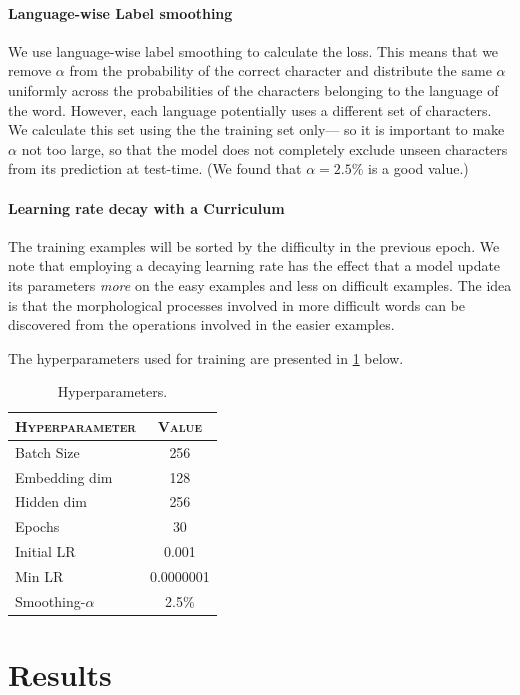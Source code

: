 \documentclass[11pt,a4paper]{article}
\begin{document}
\paragraph{Language-wise Label smoothing} We use language-wise label
smoothing to calculate the loss. This means that we remove $\alpha$
from the probability of the correct character and distribute the same
$\alpha$ uniformly across the probabilities of the characters
belonging to the language of the word. However, each language
potentially uses a different set of characters. We calculate this set
using the the training set only--- so it is important to make $\alpha$
not too large, so that the model does not completely exclude unseen
characters from its prediction at test-time. (We found that
\(\alpha=2.5\%\) is a good value.)

\paragraph{Learning rate decay with a Curriculum} The training
examples will be sorted by the difficulty in the previous epoch.  We
note that employing a decaying learning rate has the effect that a
model update its parameters \textit{more} on the easy examples and
less on difficult examples. The idea is that the morphological
processes involved in more difficult words can be discovered from the
operations involved in the easier examples.

The hyperparameters used for training are presented in \cref{tab:hp} below.
\begin{table}[h]	
\centering
\begin{tabular}{lc}
\textsc{Hyperparameter} & \textsc{Value} \\
  \hline
  Batch Size & 256 \\
  Embedding dim & 128 \\
  Hidden dim & 256 \\
  Epochs & 30 \\
  Initial LR & 0.001 \\
  Min LR & 0.0000001 \\
  Smoothing-$\alpha$ & 2.5\% \\
\end{tabular} 
\caption{Hyperparameters.}
\label{tab:hp}
\end{table}

\section{Results}
\end{document}
